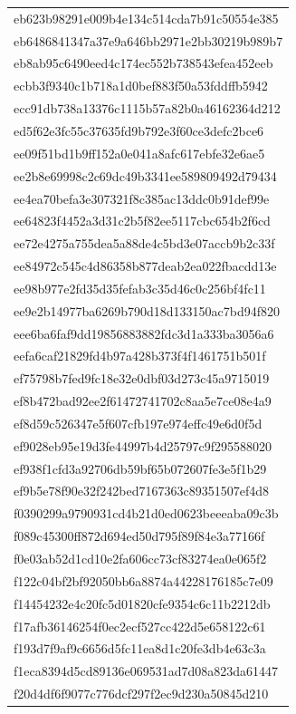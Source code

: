 \begin{tabular}{l}
eb623b98291e009b4e134c514cda7b91c50554e385 \\
eb6486841347a37e9a646bb2971e2bb30219b989b7 \\
eb8ab95c6490eed4c174ec552b738543efea452eeb \\
ecbb3f9340c1b718a1d0bef883f50a53fddffb5942 \\
ecc91db738a13376c1115b57a82b0a46162364d212 \\
ed5f62e3fc55c37635fd9b792e3f60ce3defc2bce6 \\
ee09f51bd1b9ff152a0e041a8afc617ebfe32e6ae5 \\
ee2b8e69998c2c69dc49b3341ee589809492d79434 \\
ee4ea70befa3e307321f8c385ac13ddc0b91def99e \\
ee64823f4452a3d31c2b5f82ee5117cbc654b2f6cd \\
ee72e4275a755dea5a88de4c5bd3e07accb9b2c33f \\
ee84972c545c4d86358b877deab2ea022fbacdd13e \\
ee98b977e2fd35d35fefab3c35d46c0c256bf4fc11 \\
ee9e2b14977ba6269b790d18d133150ac7bd94f820 \\
eee6ba6faf9dd19856883882fdc3d1a333ba3056a6 \\
eefa6caf21829fd4b97a428b373f4f1461751b501f \\
ef75798b7fed9fc18e32e0dbf03d273c45a9715019 \\
ef8b472bad92ee2f61472741702c8aa5e7ce08e4a9 \\
ef8d59c526347e5f607cfb197e974effc49e6d0f5d \\
ef9028eb95e19d3fe44997b4d25797c9f295588020 \\
ef938f1cfd3a92706db59bf65b072607fe3e5f1b29 \\
ef9b5e78f90e32f242bed7167363c89351507ef4d8 \\
f0390299a9790931cd4b21d0ed0623beeeaba09c3b \\
f089c45300ff872d694ed50d795f89f84e3a77166f \\
f0e03ab52d1cd10e2fa606cc73cf83274ea0e065f2 \\
f122c04bf2bf92050bb6a8874a44228176185c7e09 \\
f14454232e4c20fc5d01820cfe9354c6c11b2212db \\
f17afb36146254f0ec2ecf527cc422d5e658122c61 \\
f193d7f9af9c6656d5fc11ea8d1c20fe3db4e63c3a \\
f1eca8394d5cd89136e069531ad7d08a823da61447 \\
f20d4df6f9077c776dcf297f2ec9d230a50845d210 \\

\end{tabular}
